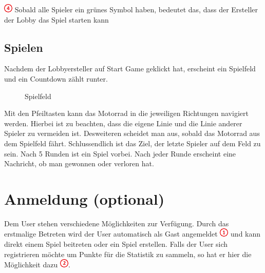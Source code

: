 \documentclass[11pt,ngerman]{article}
\begin{document}
    \includegraphics{figures/4.png} Sobald alle Spieler ein grünes Symbol haben, bedeutet das, dass der Ersteller der Lobby das Spiel starten kann
    
    \subsection{Spielen}
    
    Nachdem der Lobbyersteller auf Start Game geklickt hat, erscheint ein Spielfeld und ein Countdown zählt runter.
    
    \begin{figure}[H]
    	\centering
    	\caption{Spielfeld}
    	\label{fig:Spielfeld}
    \end{figure}
    
    Mit den Pfeiltasten kann das Motorrad in die jeweiligen Richtungen navigiert werden. 
    Hierbei ist zu beachten, dass die eigene Linie und die Linie anderer Spieler zu vermeiden ist. Desweiteren scheidet man aus, sobald das Motorrad aus dem Spielfeld fährt. 
    Schlussendlich ist das Ziel, der letzte Spieler auf dem Feld zu sein. Nach 5 Runden ist ein Spiel vorbei. Nach jeder Runde erscheint eine Nachricht, ob man gewonnen oder verloren hat.
   
     \section{Anmeldung (optional)}
    
    Dem User stehen verschiedene Möglichkeiten zur Verfügung. Durch das erstmalige Betreten wird der User automatisch als Gast angemeldet \includegraphics{figures/1.png} und kann direkt einem Spiel beitreten oder ein Spiel erstellen. 
    Falls der User sich registrieren möchte um Punkte für die Statistik zu sammeln, so hat er hier die Möglichkeit dazu \includegraphics{figures/2.png}. 
    
\end{document}
